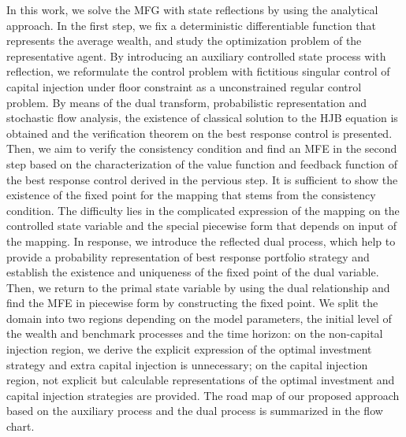 \documentclass[11pt,times,letter]{article}
\numberwithin{equation}{section}
\begin{document}
In this work, we solve the MFG with state reflections by using the analytical approach. In the first step, we fix a deterministic differentiable function that represents the average wealth, and study the optimization problem of the representative agent. By introducing  an auxiliary controlled state process with reflection, we reformulate the control problem with fictitious singular control of capital injection under floor constraint as a unconstrained regular control problem. By means of the dual transform, probabilistic representation and stochastic flow analysis, the existence of classical solution to the HJB equation is obtained and the verification theorem on the best response control is presented. Then, we aim to  verify the consistency condition and find an MFE in the second step based on the characterization of the value function and feedback function of the best response control derived in the pervious step. It is sufficient to show the existence of the fixed point for the mapping that stems from the consistency condition. The difficulty lies in the complicated expression of the mapping on the controlled state variable and the special piecewise form that depends on input of the mapping. In response, we introduce the reflected dual process, which help to provide a probability representation of best response portfolio strategy and establish the existence and uniqueness of the fixed point of the dual variable. Then, we return to the primal state variable by using the dual relationship and find the MFE in piecewise form by constructing the fixed point. We split the domain into two regions depending on the model parameters, the initial level of the wealth and benchmark processes and the time horizon: on the non-capital injection region, we derive the explicit expression of the optimal investment strategy and extra capital injection is unnecessary; on the capital injection region, not explicit but calculable representations of the optimal investment and capital injection strategies are provided. The road map of our proposed approach based on the auxiliary process and the dual process is summarized in the flow chart.  
\end{document}

